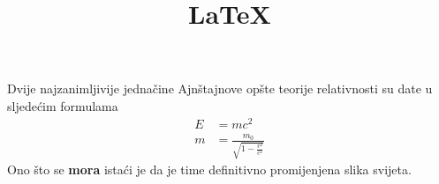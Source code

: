 \documentclass[12pt]{article}
\title{\LaTeX}
\date{}
\begin{document}
  \maketitle
Dvije najzanimljivije jedna\v{c}ine Ajn\v{s}tajnove op\v{s}te teorije relativnosti su date u
sljede\'{c}im formulama 
  \begin{align}
    E &= mc^2                              \\
    m &= \frac{m_0}{\sqrt{1-\frac{v^2}{c^2}}}
  \end{align}
Ono \v{s}to se \textbf{mora} ista\'{c}i je da je time definitivno promijenjena slika svijeta.
\end{document}
